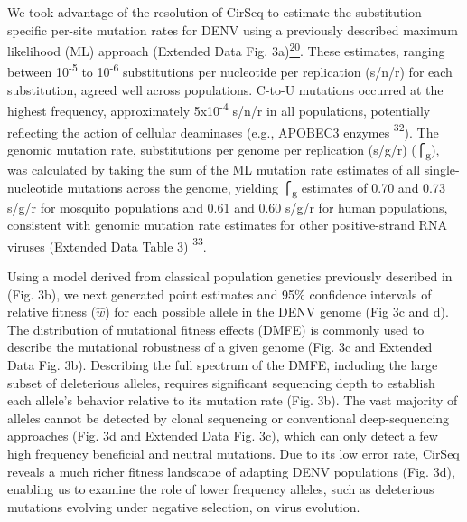 \documentclass[
]{article}
\begin{document}
We took advantage of the resolution of CirSeq to estimate the
substitution-specific per-site mutation rates for DENV using a
previously described maximum likelihood (ML) approach (Extended Data
Fig.
3a)\href{https://paperpile.com/c/REZjPf/bczFl}{\textsuperscript{20}}.
These estimates, ranging between 10\textsuperscript{-5} to
10\textsuperscript{-6} substitutions per nucleotide per replication
(s/n/r) for each substitution, agreed well across populations. C-to-U
mutations occurred at the highest frequency, approximately
5x10\textsuperscript{-4} s/n/r in all populations, potentially
reflecting the action of cellular deaminases (e.g., APOBEC3 enzymes
\href{https://paperpile.com/c/REZjPf/M9gyT}{\textsuperscript{32}}). The
genomic mutation rate, substitutions per genome per replication (s/g/r)
(⎧\textsubscript{g}), was calculated by taking the sum of the ML
mutation rate estimates of all single-nucleotide mutations across the
genome, yielding ⎧\textsubscript{g} estimates of 0.70 and 0.73 s/g/r for
mosquito populations and 0.61 and 0.60 s/g/r for human populations,
consistent with genomic mutation rate estimates for other
positive-strand RNA viruses (Extended Data Table 3)
\href{https://paperpile.com/c/REZjPf/I2u2G}{\textsuperscript{33}}.

Using a model derived from classical population genetics previously
described in (Fig. 3b), we next generated point estimates and 95\%
confidence intervals of relative fitness (\(\widehat{w}\)) for each
possible allele in the DENV genome (Fig 3c and d). The distribution of
mutational fitness effects (DMFE) is commonly used to describe the
mutational robustness of a given genome (Fig. 3c and Extended Data Fig.
3b). Describing the full spectrum of the DMFE, including the large
subset of deleterious alleles, requires significant sequencing depth to
establish each allele's behavior relative to its mutation rate (Fig.
3b). The vast majority of alleles cannot be detected by clonal
sequencing or conventional deep-sequencing approaches (Fig. 3d and
Extended Data Fig. 3c), which can only detect a few high frequency
beneficial and neutral mutations. Due to its low error rate, CirSeq
reveals a much richer fitness landscape of adapting DENV populations
(Fig. 3d), enabling us to examine the role of lower frequency alleles,
such as deleterious mutations evolving under negative selection, on
virus evolution.
\end{document}
